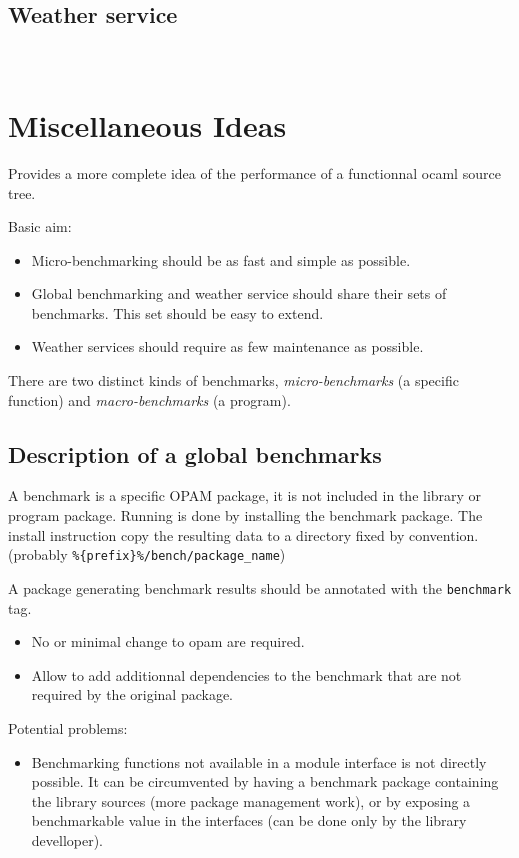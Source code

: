 \documentclass[11pt,a4paper]{article}
\begin{document}
\subsection{Weather service}
~\vspace{4cm}~

\section{Miscellaneous Ideas}

Provides a more complete idea of the performance of a functionnal
ocaml source tree.

Basic aim:
\begin{itemize}
\item Micro-benchmarking should be as fast and simple as possible.
\item Global benchmarking and weather service should share their sets
  of benchmarks. This set should be easy to extend.
\item Weather services should require as few maintenance as possible.
\end{itemize}

There are two distinct kinds of benchmarks, \emph{micro-benchmarks} (a specific
function) and \emph{macro-benchmarks} (a program).

\subsection{Description of a global benchmarks}

A benchmark is a specific OPAM package, it is not included in the
library or program package. Running is done by installing the
benchmark package. The install instruction copy the resulting data to
a directory fixed by convention. (probably
\texttt{\%\{prefix\}\%/bench/package\_name})

A package generating benchmark results should be annotated with the
\texttt{benchmark} tag.

\begin{itemize}
\item No or minimal change to opam are required.
\item Allow to add additionnal dependencies to the benchmark that are
  not required by the original package.
\end{itemize}

Potential problems:
\begin{itemize}
\item Benchmarking functions not available in a module interface is
  not directly possible. It can be circumvented by having a benchmark
  package containing the library sources (more package management
  work), or by exposing a benchmarkable value in the interfaces (can
  be done only by the library develloper).
\end{itemize}
\end{document}
